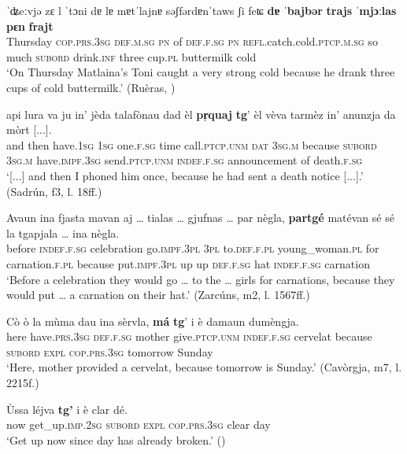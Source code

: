  \ea
 \label{ex:caus1}
  \gll ˈʥeːvjǝ zɛ l ˈtɔni dɐ lɐ mɐtˈlajnɐ sǝʃfǝrdɐnˈtaws ʃi feʨ \textbf{dɐ} ˈ\textbf{bajbǝr} \textbf{trajs} \textbf{ˈmjɔːlas} \textbf{pɛn} \textbf{frajt}\\
 Thursday \textsc{cop.prs.3sg} \textsc{def.m.sg} \textsc{pn} of \textsc{def.f.sg} \textsc{pn} \textsc{refl}.catch.cold.\textsc{ptcp.m.sg} so much \textsc{subord} drink.\textsc{inf} three cup.\textsc{pl} buttermilk cold\\
 \glt `On Thursday Matlaina’s Toni caught a very strong cold because he drank three cups of cold buttermilk.' (Ruèras, \citealt[9]{Valär2013b})
 \z

\ea
\label{ex:caus3}
\gll  [...] api lura va ju in’ jèda talafònau dad èl \textbf{pr̩quaj} \textbf{tg}' èl vèva tarmèz in’ anunzja da mòrt [...].\\
{} and then have.\textsc{1sg}  \textsc{1sg} one.\textsc{f.sg} time call.\textsc{ptcp.unm} \textsc{dat} \textsc{3sg.m} because \textsc{subord} \textsc{3sg.m} have.\textsc{impf.3sg} send.\textsc{ptcp.unm} \textsc{indef.f.sg} announcement of death.\textsc{f.sg}\\ 
\glt `[...] and then I phoned him once, because he had sent a death notice [...].' (Sadrún, f3, l. 18ff.)
\z

\ea
\label{ex:caus4}
\gll    Avaun ina fjasta mavan aj … tialas … gjufnas … par nègla, \textbf{partgé} matévan sé sé la tgapjala … ina nègla.\\
before \textsc{indef.f.sg} celebration go.\textsc{impf.3pl} \textsc{3pl} {} to.\textsc{def.f.pl} {}  young\_woman.\textsc{pl} {} for carnation.\textsc{f.pl} because put.\textsc{impf.3pl} up up  \textsc{def.f.sg} hat {} \textsc{indef.f.sg} carnation \\
\glt `Before a celebration they would go … to the … girls for carnations, because they would put … a carnation on their hat.' (Zarcúns, m2, l. 1567ff.)
\z

\ea
\label{ex:caus5}
\gll Cò ò la mùma dau ina sèrvla, \textbf{má} \textbf{tg}’ i è damaun dumèngja.\\
here have.\textsc{prs.3sg} \textsc{def.f.sg} mother give.\textsc{ptcp.unm} \textsc{indef.f.sg} cervelat because \textsc{subord} \textsc{expl} \textsc{cop.prs.3sg} tomorrow Sunday\\
\glt `Here, mother provided a cervelat, because tomorrow is Sunday.' (Cavòrgja, m7, l. 2215f.)
\z

\ea
\label{ex:caus6}
\gll Ùssa léjva \textbf{tg'} i è clar dé.\\
  now get\_up.\textsc{imp.2sg} \textsc{subord} \textsc{expl} \textsc{cop.prs.3sg} clear day\\
\glt `Get up now since day has already broken.' ()
\z

